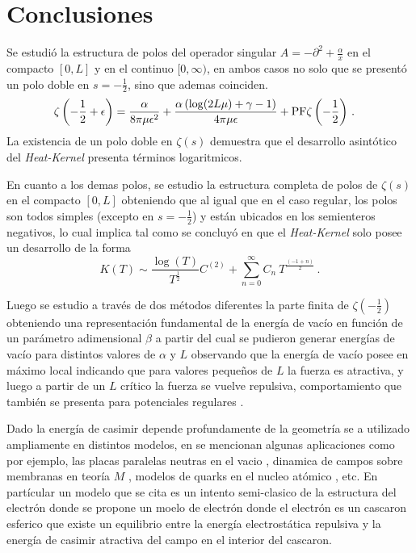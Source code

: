 \chapter{Conclusiones}

Se estudió la estructura de polos del operador singular $A = - \partial ^2 + \frac{\alpha}{x} $ en el compacto $[0,L]$ y en el continuo $[0, \infty)$, en ambos casos no solo que se presentó un polo doble en $s= -\frac{1}{2}$, sino que ademas coinciden.
\begin{align*}
&
	\zeta \left( - \frac{1}{2} + \epsilon \right) = 
	\frac{\alpha}{8 \pi \mu  \epsilon  ^2} +
	\frac{\alpha \left( \log (2 L \mu ) + \gamma -1  \right)}{4 \pi \mu  \epsilon } +
	{\rm PF } \zeta \left( - \frac{1}{2} \right)
\, .
\end{align*}
La existencia de un polo doble en $\zeta (s)$ demuestra que el desarrollo asintótico del {\it Heat-Kernel} presenta términos logaritmicos.

En cuanto a los demas polos, se estudio la estructura completa de polos de $\zeta \left(s \right)$ en el compacto $[0,L]$ obteniendo que al igual que en el caso regular, los polos son todos simples (excepto en $s= - \frac{1}{2}$) y están ubicados en los semienteros negativos, lo cual implica tal como se concluyó en \cite{Callias1980} que el {\it Heat-Kernel} solo posee un desarrollo de la forma  
\begin{equation}
	K(T) \sim 
	\frac{ \log (T)}{T ^{\frac{1}{2} }} C ^{(2)} +
	\sum _{n=0} ^{\infty}
	C _n  \ 
	T^{\frac{(-1+n)}{2}} 
\, .
\end{equation}


Luego se estudio a través de dos métodos diferentes la parte finita de $\zeta \left( - \frac{1}{2} \right)$ obteniendo una representación fundamental de la energía de vacío en función de un parámetro adimensional $\beta$ a partir del cual se pudieron generar energías de vacío para distintos valores de $\alpha$ y $L$ observando que la energía de vacío posee en máximo local indicando que para valores pequeños de $L$ la fuerza es atractiva, y luego a partir de un $L$ crítico la fuerza se vuelve repulsiva, comportamiento que también se presenta para potenciales regulares \cite{Beauregard_2013}.

Dado la energía de casimir depende profundamente de la geometría se a utilizado ampliamente en distintos modelos, en \cite{Blau:1988kv} se mencionan algunas aplicaciones como por ejemplo, las placas paralelas neutras en el vacio , dinamica de campos sobre membranas en teoría $M$ \cite{DEWIT1988545}, modelos de quarks en el nucleo atómico \cite{PhysRevD.14.2622}, etc. En partícular un modelo que se cita es un intento semi-clasico de la estructura del electrón \cite{MILTON198049} donde se propone un moelo de electrón donde el electrón es un cascaron esferico que existe un equilibrio entre la  energía electrostática repulsiva y la energía de casimir atractiva del campo en el interior del cascaron.

